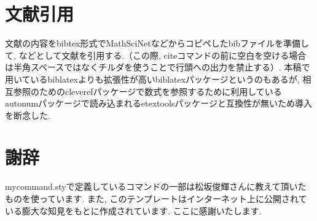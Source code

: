 \documentclass[11pt,a4paper,oneside,lualatex]{ltjsarticle} %
\numberwithin{equation}{section} %
\begin{document}
\section{文献引用} \label{sec:bib}


文献の内容をbibtex形式でMathSciNetなどからコピペしたbibファイルを準備して, \cite[定理 1.1]{AM}などとして文献を引用する.（この際, citeコマンドの前に空白を空ける場合は半角スペースではなくチルダを使うことで行頭への出力を禁止する）.
本稿で用いているbiblatexよりも拡張性が高いbiblatexパッケージというのもあるが, 相互参照のためのcleverefパッケージで数式を参照するために利用しているautonumパッケージで読み込まれるetextoolsパッケージと互換性が無いため導入を断念した. 


\section*{謝辞}


mycommand.styで定義しているコマンドの一部は松坂俊輝さんに教えて頂いたものを使っています.
また, このテンプレートはインターネット上に公開されている膨大な知見をもとに作成されています.
ここに感謝いたします.




\end{document}
